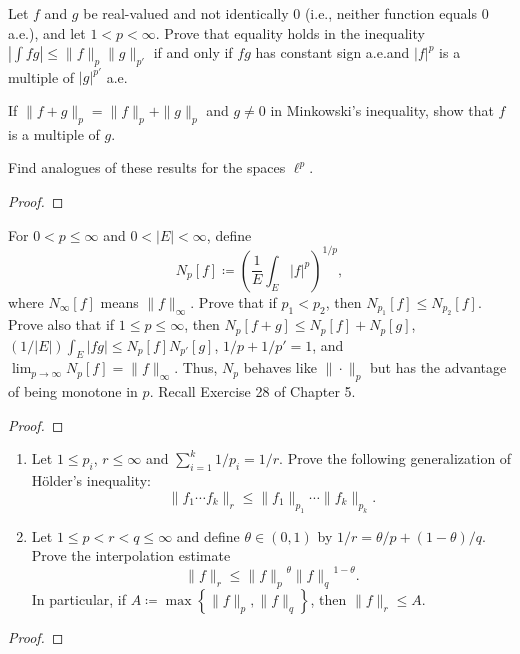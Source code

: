 \begin{problem}
Let $f$ and $g$ be real-valued and not identically $0$ (i.e., neither
function equals $0$ a.e.), and let $1<p<\infty$. Prove that equality holds
in the inequality $\left|\int fg\right|\leq\|f\|_p\|g\|_{p'}$ if and only if
$fg$ has constant sign a.e.\@ and $|f|^p$ is a multiple of $|g|^{p'}$ a.e.

If $\|f+g\|_p=\|f\|_p+\|g\|_{p}$ and $g\neq 0$ in Minkowski's inequality,
show that $f$ is a multiple of $g$.

Find analogues of these results for the spaces $\ell^p$.
\end{problem}
\begin{proof}
\end{proof}
\newpage

\begin{problem}
For $0<p\leq\infty$ and $0<|E|<\infty$, define
\[
N_p[f]\coloneqq\left(\frac{1}{E}\int_E|f|^p\right)^{1/p},
\]
where $N_\infty[f]$ means $\|f\|_\infty$. Prove that if $p_1<p_2$, then
$N_{p_1}[f]\leq N_{p_2}[f]$. Prove also that if $1\leq p\leq \infty$, then
$N_p[f+g]\leq N_p[f]+N_p[g]$, $(1/|E|)\int_E|fg|\leq N_p[f]N_{p'}[g]$,
$1/p+1/p'=1$, and $\lim_{p\to\infty} N_p[f]=\|f\|_\infty$. Thus, $N_p$
behaves like $\|\cdot\|_p$ but has the advantage of being monotone in
$p$. Recall Exercise 28 of Chapter 5.
\end{problem}
\begin{proof}
\end{proof}
\newpage

\begin{problem}
\begin{enumerate}[label=(\alph*)]
\item Let $1\leq p_i$, $r\leq\infty$ and $\sum_{i=1}^k1/p_i=1/r$. Prove the
  following generalization of Hölder's inequality:
\[
\|f_1\dotsm f_k\|_r\leq\|f_1\|_{p_1}\dotsm\|f_k\|_{p_k}.
\]
\item Let $1\leq p<r<q\leq\infty$ and define $\theta\in(0,1)$ by
  $1/r=\theta/p+(1-\theta)/q$. Prove the interpolation estimate
\[
\|f\|_r\leq{\|f\|_p}^\theta{\|f\|_q}^{1-\theta}.
\]
In particular, if $A\coloneqq\max\left\{\|f\|_p,\|f\|_q\right\}$, then
$\|f\|_r\leq A$.
\end{enumerate}
\end{problem}
\begin{proof}
\end{proof}
\newpage

